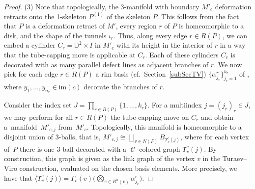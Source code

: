 \documentclass[10pt,a4paper]{amsart}
\DeclareMathOperator{\Hom}{Hom}
\DeclareMathOperator{\calc}{\mathcal{C}}
\numberwithin{equation}{section}
\theoremstyle{definition}
\begin{document}
\begin{proof}
 (3) Note that topologically, the 3-manifold with boundary $M'_c$ deformation retracts onto the 1-skeleton $P^{(1)}$ of the skeleton $P$. This follows from the fact that $P$ is a deformation retract of $M'$, every region $r$ of $P$ is homeomorphic to a disk, and the shape of the tunnels $\iota_r$. Thus, along every edge $r \in R(P)$, we can embed a cylinder $C_r = \mathbb{D}^2 \times I$ in $M'_c$ with its height in the interior of $r$ in a way that the tube-capping move is applicable at $C_r$. Each of these cylinders $C_r$ is decorated with as many parallel defect lines as adjacent branches of $r$. We now pick for each edge $r \in R(P)$ a rim basis (cf.\ Section~\ref{subSecTV}) $\{\alpha_{j_r}^r\}_{j_r=1}^{k_r}$ of \smash{$\Hom_{\calc}\bigl(y_1^{\varepsilon(1)} \otimes \dots \otimes y_{n_r}^{\varepsilon(n_r)}, \mathbbm{1}\bigr)$}, where $y_1, \dots, y_{n_r} \in \mathrm{im}(c)$ decorate the branches of $r$.

 Consider the index set $J = \prod_{r \in R(P)} \{1, \dots, k_r\}$. For a multiindex $j = (j_r)_r \in J$, we may perform for all $r \in R(P)$ the tube-capping move  on $C_r$ and obtain a~mani\-fold~$M'_{c,j}$ from~$M'_c$. Topologically, this manifold is homeomorphic to a disjoint union of 3-balls, that is, $M'_{c,j} \cong \bigsqcup_{v \in N(P)}B_{\Upsilon_v^c(j)}$, where for each vertex of~$P$ there is one 3-ball decorated with a $\calc$-colored graph $\Upsilon_v^c(j)$. By construction, this graph is given as the link graph of the vertex $v$ in the Turaev--Viro construction, evaluated on the chosen basis elements. More precisely, we have that $\langle\Upsilon_v^c(j)\rangle = \Gamma_c(v)\bigl( \bigotimes_{e \in R^h(v)}\alpha_{j_e}^e\bigr)$.


\end{proof}
\end{document}
